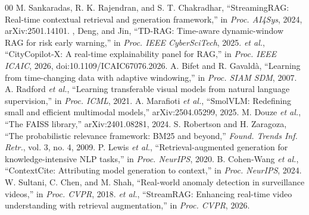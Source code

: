\documentclass[conference]{IEEEtran}
\begin{document}
\begin{thebibliography}{00}
 M. Sankaradas, R. K. Rajendran, and S. T. Chakradhar, ``StreamingRAG: Real-time contextual retrieval and generation framework,'' in \emph{Proc. AI4Sys}, 2024, arXiv:2501.14101.
 \Xu, Deng, and Jin, ``TD-RAG: Time-aware dynamic-window RAG for risk early warning,'' in \emph{Proc. IEEE CyberSciTech}, 2025.
 \Gudipati \emph{et al.}, ``CityCopilot-X: A real-time explainability panel for RAG,'' in \emph{Proc. IEEE ICAIC}, 2026, doi:10.1109/ICAIC67076.2026.
 A. Bifet and R. Gavald\`a, ``Learning from time-changing data with adaptive windowing,'' in \emph{Proc. SIAM SDM}, 2007.
 A. Radford \emph{et al.}, ``Learning transferable visual models from natural language supervision,'' in \emph{Proc. ICML}, 2021.
 A. Marafioti \emph{et al.}, ``SmolVLM: Redefining small and efficient multimodal models,'' arXiv:2504.05299, 2025.
 M. Douze \emph{et al.}, ``The FAISS library,'' arXiv:2401.08281, 2024.
 S. Robertson and H. Zaragoza, ``The probabilistic relevance framework: BM25 and beyond,'' \emph{Found. Trends Inf. Retr.}, vol. 3, no. 4, 2009.
 P. Lewis \emph{et al.}, ``Retrieval-augmented generation for knowledge-intensive NLP tasks,'' in \emph{Proc. NeurIPS}, 2020.
 B. Cohen-Wang \emph{et al.}, ``ContextCite: Attributing model generation to context,'' in \emph{Proc. NeurIPS}, 2024.
 W. Sultani, C. Chen, and M. Shah, ``Real-world anomaly detection in surveillance videos,'' in \emph{Proc. CVPR}, 2018.
 \Xie \emph{et al.}, ``StreamRAG: Enhancing real-time video understanding with retrieval augmentation,'' in \emph{Proc. CVPR}, 2026.
\end{thebibliography}
\end{document}
